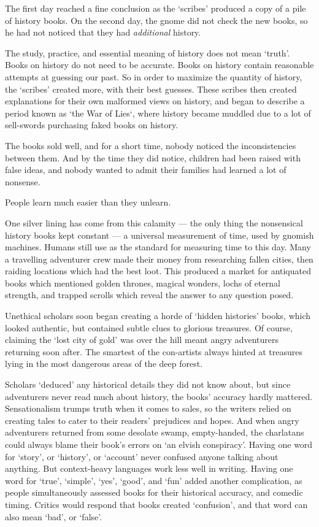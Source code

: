 \begin{multicols}{2}
\begin{exampletext}
    The first day reached a fine conclusion as the `scribes' produced a copy of a pile of history books.
    On the second day, the gnome did not check the new books, so he had not noticed that they had \emph{additional} history.

    The study, practice, and essential meaning of history does not mean `truth'.
    Books on history do not need to be accurate.
    Books on history contain reasonable attempts at guessing our past.
    So in order to maximize the quantity of history, the `scribes' created more, with their best guesses.
    These scribes then created explanations for their own malformed views on history, and began to describe a period known as `the War of Lies`, where history became muddled due to a lot of sell-swords purchasing faked books on history.

    The books sold well, and for a short time, nobody noticed the inconsistencies between them.
    And by the time they did notice, children had been raised with false ideas, and nobody wanted to admit their families had learned a lot of nonsense.

    People learn much easier than they unlearn.

    One silver lining has come from this calamity --- the only thing the nonsensical history books kept constant --- a universal measurement of time, used by gnomish machines.
    Humans still use  as the standard for measuring time to this day.
  \or
    Many a travelling adventurer crew made their money from researching fallen cities, then raiding locations which had the best loot.
    This produced a market for antiquated books which mentioned golden thrones, magical wonders, lochs of eternal strength, and trapped scrolls which reveal the answer to any question posed.

    Unethical scholars soon began creating a horde of `hidden histories' books, which looked authentic, but contained subtle clues to glorious treasures.
    Of course, claiming the `lost city of gold' was over the hill meant angry adventurers returning soon after.
    The smartest of the con-artists always hinted at treasures lying in the most dangerous areas of the deep forest.

    Scholars `deduced' any historical details they did not know about, but since adventurers never read much about history, the books' accuracy hardly mattered.
    Sensationalism trumps truth when it comes to sales, so the writers relied on creating tales to cater to their readers' prejudices and hopes.
    And when angry adventurers returned from some desolate swamp, empty-handed, the charlatans could always blame their book's errors on `an elvish conspiracy'.
  \else
    Having one word for `story', or `history', or `account' never confused anyone talking about anything.
    But context-heavy languages work less well in writing.
    Having one word for `true', `simple', `yes', `good', and `fun' added another complication, as people simultaneously assessed books for their historical accuracy, and comedic timing.
    Critics would respond that books created `confusion', and that word can also mean `bad', or `false'.


\end{exampletext}
\end{multicols}
